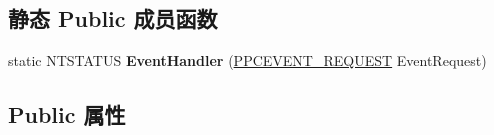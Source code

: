 \subsection*{静态 Public 成员函数}
\begin{DoxyCompactItemize}
\item 
\mbox{\label{class_c_c_m_i_topology_a93a4c597116a2dd98c73d119cab8031b}} 
static N\+T\+S\+T\+A\+T\+US {\bfseries Event\+Handler} (\hyperlink{struct___p_c_e_v_e_n_t___r_e_q_u_e_s_t}{P\+P\+C\+E\+V\+E\+N\+T\+\_\+\+R\+E\+Q\+U\+E\+ST} Event\+Request)
\end{DoxyCompactItemize}
\subsection*{Public 属性}
